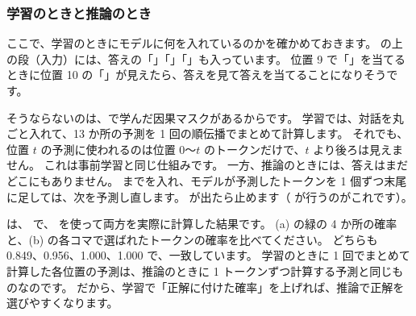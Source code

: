 \subsubsection*{学習のときと推論のとき}

ここで、学習のときにモデルに何を入れているのかを確かめておきます。
の上の段（入力）には、答えの「」「」「」も入っています。
位置 9 で「」を当てるときに位置 10 の「」が見えたら、答えを見て答えを当てることになりそうです。

そうならないのは、で学んだ因果マスクがあるからです。
学習では、対話を丸ごと入れて、13 か所の予測を 1 回の順伝播でまとめて計算します。
それでも、位置 $t$ の予測に使われるのは位置 0〜$t$ のトークンだけで、$t$ より後ろは見えません。
これは事前学習と同じ仕組みです。
一方、推論のときには、答えはまだどこにもありません。
 までを入れ、モデルが予測したトークンを 1 個ずつ末尾に足しては、次を予測し直します。
 が出たら止めます（ が行うのがこれです）。

は、 で、 を使って両方を実際に計算した結果です。
(a) の緑の 4 か所の確率と、(b) の各コマで選ばれたトークンの確率を比べてください。
どちらも 0.849、0.956、1.000、1.000 で、一致しています。
学習のときに 1 回でまとめて計算した各位置の予測は、推論のときに 1 トークンずつ計算する予測と同じものなのです。
だから、学習で「正解に付けた確率」を上げれば、推論で正解を選びやすくなります。

